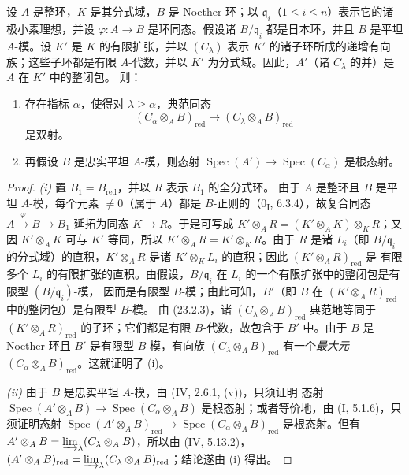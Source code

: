\begin{proposition}[23.2.4]
\label{0.23.2.4-fr}
设 $A$ 是整环，$K$ 是其分式域，$B$ 是 Noether 环；以
$\mathfrak q_i$（$1\leqslant i\leqslant n$）表示它的诸极小素理想，并设
$\varphi:A\to B$ 是环同态。假设诸 $B/\mathfrak q_i$ 都是日本环，并且
$B$ 是平坦 $A$-模。设 $K'$ 是 $K$ 的有限扩张，并以 $(C_\lambda)$ 表示
$K'$ 的诸子环所成的递增有向族；这些子环都是有限 $A$-代数，并以 $K'$
为分式域。因此，$A'$（诸 $C_\lambda$ 的并）是 $A$ 在 $K'$ 中的整闭包。
则：
\begin{enumerate}
  \item[(i)] 存在指标 $\alpha$，使得对 $\lambda\geqslant
  \alpha$，典范同态
  \begin{equation}
  \label{0.23.2.4.1-fr}
    (C_\alpha\otimes_AB)_{\mathrm{red}}
    \longrightarrow(C_\lambda\otimes_AB)_{\mathrm{red}}
    \tag{23.2.4.1}
  \end{equation}
  是双射。
  \item[(ii)] 再假设 $B$ 是忠实平坦 $A$-模，则态射
  $\operatorname{Spec}(A')\to\operatorname{Spec}(C_\alpha)$ 是根态射。
\end{enumerate}
\end{proposition}

\begin{proof}
\emph{(i)} 置 $B_1=B_{\mathrm{red}}$，并以 $R$ 表示 $B_1$ 的全分式环。
由于 $A$ 是整环且 $B$ 是平坦 $A$-模，每个元素 $\neq0$（属于 $A$）都是
$B$-正则的（0\textsubscript{I}, 6.3.4），故复合同态
$A\xrightarrow{\varphi}B\to B_1$ 延拓为同态 $K\to R$。于是可写成
$K'\otimes_AR=(K'\otimes_AK)\otimes_KR$；又因 $K'\otimes_AK$ 可与
$K'$ 等同，所以 $K'\otimes_AR=K'\otimes_KR$。由于 $R$ 是诸
$L_i$（即 $B/\mathfrak q_i$ 的分式域）的直积，$K'\otimes_AR$ 是诸
$K'\otimes_KL_i$ 的直积；因此 $(K'\otimes_AR)_{\mathrm{red}}$ 是
有限多个 $L_i$ 的有限扩张的直积。由假设，$B/\mathfrak q_i$ 在
$L_i$ 的一个有限扩张中的整闭包是有限型 $(B/\mathfrak q_i)$-模，
因而是有限型 $B$-模；由此可知，$B'$（即 $B$ 在
$(K'\otimes_AR)_{\mathrm{red}}$ 中的整闭包）是有限型 $B$-模。
由 (23.2.3)，诸 $(C_\lambda\otimes_AB)_{\mathrm{red}}$ 典范地等同于
$(K'\otimes_AR)_{\mathrm{red}}$ 的子环；它们都是有限 $B$-代数，故包含于
$B'$ 中。由于 $B$ 是 Noether 环且 $B'$ 是有限型 $B$-模，有向族
$(C_\lambda\otimes_AB)_{\mathrm{red}}$ 有一个\emph{最大元}
$(C_\alpha\otimes_AB)_{\mathrm{red}}$。这就证明了 (i)。

\emph{(ii)} 由于 $B$ 是忠实平坦 $A$-模，由 (IV, 2.6.1, (v))，只须证明
态射 $\operatorname{Spec}(A'\otimes_AB)\to
\operatorname{Spec}(C_\alpha\otimes_AB)$ 是根态射；或者等价地，由
(I, 5.1.6)，只须证明态射
$\operatorname{Spec}(A'\otimes_AB)_{\mathrm{red}}\to
\operatorname{Spec}(C_\alpha\otimes_AB)_{\mathrm{red}}$ 是根态射。但有
$A'\otimes_AB=\varinjlim_\lambda(C_\lambda\otimes_AB)$，所以由
(IV, 5.13.2)，
$(A'\otimes_AB)_{\mathrm{red}}=
\varinjlim_\lambda(C_\lambda\otimes_AB)_{\mathrm{red}}$；结论遂由 (i) 得出。
\end{proof}

